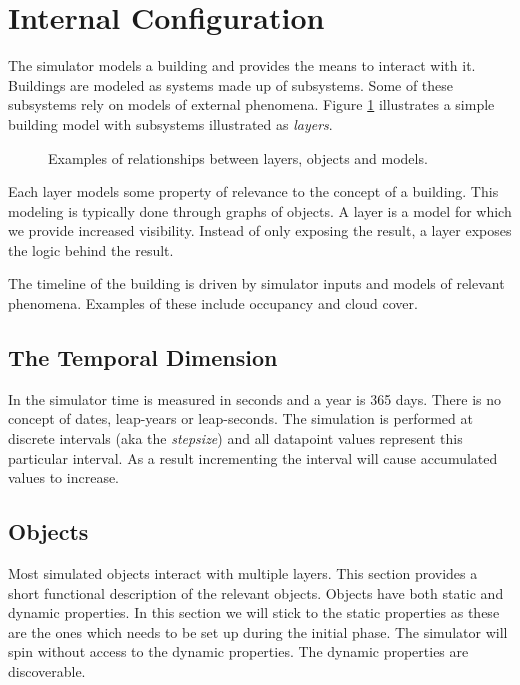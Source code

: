 \documentclass[10pt]{article}
\newcommand{\includeSVG}[1]{
  \texttt{[image: figs/\#1.pdf]}
}
\begin{document}
\section{Internal Configuration}
\label{sec:internals}

The simulator models a building and provides the means to interact with it. Buildings are modeled as systems made up of subsystems. Some of these subsystems rely on models of external phenomena. Figure \ref{fig:layers} illustrates a simple building model with subsystems illustrated as \textsl{layers}.

\begin{figure}[htb]
  \begin{center}
    \rotatebox{0}{\scalebox{0.38}{\includeSVG{layers}}}
  \end{center}
  \caption{Examples of relationships between layers, objects and models.}
  \label{fig:layers}
\end{figure}

Each layer models some property of relevance to the concept of a building. This modeling is typically done through graphs of objects. A layer is a model for which we provide increased visibility. Instead of only exposing the result, a layer exposes the logic behind the result.


The timeline of the building is driven by simulator inputs and models of relevant phenomena. Examples of these include occupancy and cloud cover.

\subsection{The Temporal Dimension}

In the simulator time is measured in seconds and a year is 365 days. There is no concept of dates, leap-years or leap-seconds. The simulation is performed at discrete intervals (aka the \textsl{stepsize}) and all datapoint values represent this particular interval. As a result incrementing the interval will cause accumulated values to increase.

\subsection{Objects}

Most simulated objects interact with multiple layers. This section provides a short functional description of the relevant objects. Objects have both static and dynamic properties. In this section we will stick to the static properties as these are the ones which needs to be set up during the initial phase. The simulator will spin without access to the dynamic properties. The dynamic properties are discoverable.
\end{document}
